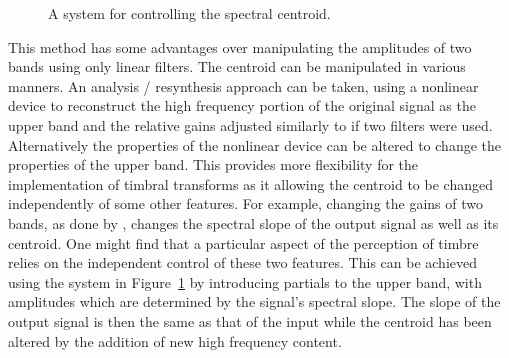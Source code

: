 			\begin{figure}[h!]
				\centering
				\caption{A system for controlling the spectral centroid.}
				\label{fig:TwoBandSpectralCentroidSystem}
			\end{figure}

			This method has some advantages over manipulating the amplitudes of two bands using only linear
			filters. The centroid can be manipulated in various manners. An analysis / resynthesis approach can
			be taken, using a nonlinear device to reconstruct the high frequency portion of the original signal
			as the upper band and the relative gains adjusted similarly to if two filters were used.
			Alternatively the properties of the nonlinear device can be altered to change the properties of the
			upper band. This provides more flexibility for the implementation of timbral transforms as it
			allowing the centroid to be changed independently of some other features. For example, changing the
			gains of two bands, as done by \citet{zacharakis2011an}, changes the spectral slope of the output
			signal as well as its centroid. One might find that a particular aspect of the perception of timbre
			relies on the independent control of these two features. This can be achieved using the system in
			Figure~\ref{fig:TwoBandSpectralCentroidSystem} by introducing partials to the upper band, with
			amplitudes which are determined by the signal's spectral slope. The slope of the output signal is
			then the same as that of the input while the centroid has been altered by the addition of new high
			frequency content.

